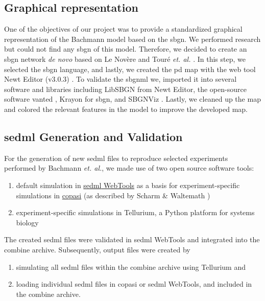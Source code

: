 \subsection*{Graphical representation}
One of the objectives of our project was to provide a standardized graphical representation of the Bachmann model based on the \ac{sbgn}. We performed research but could not find any \ac{sbgn} of this model. Therefore, we decided to create an \ac{sbgn} network \textit{de novo} based on Le Novère \cite{sbgnnovere} and Touré \textit{et. al.} \cite{sbgntoure}. In this step, we selected the \ac{sbgn} language, and lastly, we created the \ac{pd} map with the web tool Newt Editor (v3.0.3) \cite{newteditor}. To validate the \ac{sbgnml} we, imported it into several software and libraries including LibSBGN from Newt Editor, the open-source software \ac{vanted} \cite{vanted}, Krayon for \ac{sbgn}\cite{krayon}, and SBGNViz \cite{sbgnviz}. Lastly, we cleaned up the map and colored the relevant features in the model to improve the developed map.

\subsection*{\acs{sedml} Generation and Validation}
For the generation of new \ac{sedml} files to reproduce selected experiments performed by Bachmann \textit{et. al.}, we made use of two open source software tools:
\begin{enumerate}
    \item default simulation in \hyperlink{http://sysbioapps.spdns.org/SED-ML_Web_Tools}{\ac{sedml} WebTools} as a basis for experiment-specific simulations in \hyperlink{http://copasi.org/}{\ac{copasi}} (as described by Scharm \& Waltemath \cite{combine})
    \item experiment-specific simulations in Tellurium, a Python platform for systems biology \cite{tellurium}
\end{enumerate}

The created \ac{sedml} files were validated in \ac{sedml} WebTools and integrated into the \ac{combine} archive. Subsequently, output files were created by

\begin{enumerate}
    \item simulating all \ac{sedml} files within the \ac{combine} archive using Tellurium and
    \item loading individual \ac{sedml} files in \ac{copasi} or \ac{sedml} WebTools, and included in the \ac{combine} archive.
\end{enumerate}

